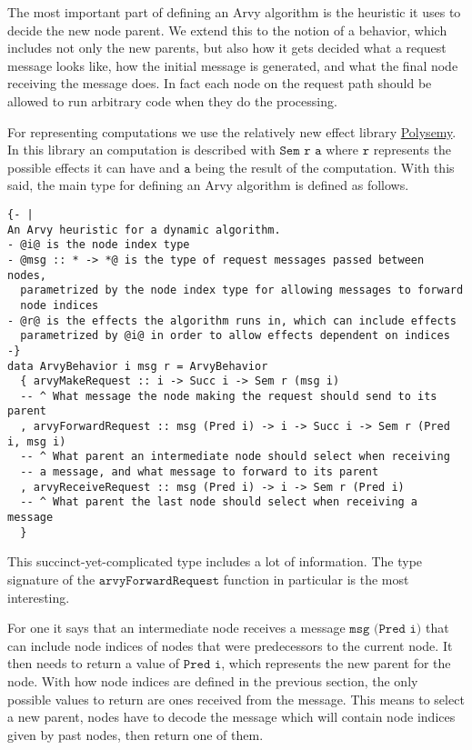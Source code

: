 \documentclass[a4paper, oneside]{discothesis}
\begin{document}
The most important part of defining an Arvy algorithm is the heuristic it uses to decide the new node parent. We extend this to the notion of a behavior, which includes not only the new parents, but also how it gets decided what a request message looks like, how the initial message is generated, and what the final node receiving the message does. In fact each node on the request path should be allowed to run arbitrary code when they do the processing.

For representing computations we use the relatively new effect library \href{https://hackage.haskell.org/package/polysemy}{Polysemy}. In this library an computation is described with $\texttt{Sem r a}$ where $\texttt{r}$ represents the possible effects it can have and $\texttt{a}$ being the result of the computation. With this said, the main type for defining an Arvy algorithm is defined as follows.

\begin{verbatim}
{- |
An Arvy heuristic for a dynamic algorithm.
- @i@ is the node index type
- @msg :: * -> *@ is the type of request messages passed between nodes,
  parametrized by the node index type for allowing messages to forward
  node indices
- @r@ is the effects the algorithm runs in, which can include effects
  parametrized by @i@ in order to allow effects dependent on indices
-}
data ArvyBehavior i msg r = ArvyBehavior
  { arvyMakeRequest :: i -> Succ i -> Sem r (msg i)
  -- ^ What message the node making the request should send to its parent
  , arvyForwardRequest :: msg (Pred i) -> i -> Succ i -> Sem r (Pred i, msg i)
  -- ^ What parent an intermediate node should select when receiving
  -- a message, and what message to forward to its parent
  , arvyReceiveRequest :: msg (Pred i) -> i -> Sem r (Pred i)
  -- ^ What parent the last node should select when receiving a message
  }
\end{verbatim}

This succinct-yet-complicated type includes a lot of information. The type signature of the $\texttt{arvyForwardRequest}$ function in particular is the most interesting.

For one it says that an intermediate node receives a message $\texttt{msg (Pred i)}$ that can include node indices of nodes that were predecessors to the current node. It then needs to return a value of $\texttt{Pred i}$, which represents the new parent for the node. With how node indices are defined in the previous section, the only possible values to return are ones received from the message. This means to select a new parent, nodes have to decode the message which will contain node indices given by past nodes, then return one of them.
\end{document}
